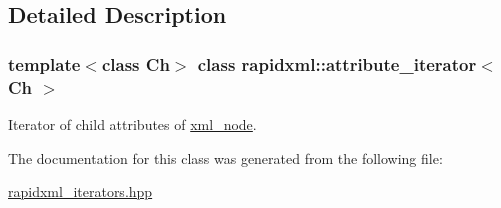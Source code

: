 \subsection{Detailed Description}
\subsubsection*{template$<$class Ch$>$\newline
class rapidxml\+::attribute\+\_\+iterator$<$ Ch $>$}

Iterator of child attributes of \mbox{\hyperlink{classrapidxml_1_1xml__node}{xml\+\_\+node}}. 

The documentation for this class was generated from the following file\+:\begin{DoxyCompactItemize}
\item 
\mbox{\hyperlink{rapidxml__iterators_8hpp}{rapidxml\+\_\+iterators.\+hpp}}\end{DoxyCompactItemize}
